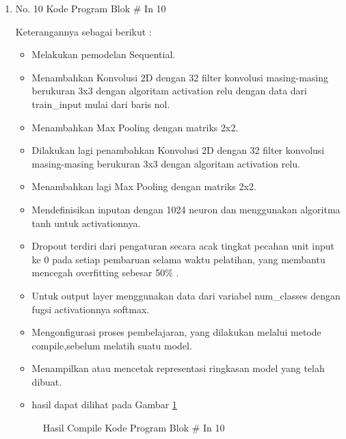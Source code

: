 \begin{enumerate}
\item No. 10 Kode Program Blok \# In 10
\par 
Keterangannya sebagai berikut :
\begin{itemize}
\item Melakukan pemodelan Sequential.
\item Menambahkan Konvolusi 2D dengan 32 filter konvolusi masing-masing berukuran 3x3 dengan algoritam activation relu dengan data dari train\_input mulai dari baris nol.
\item Menambahkan Max Pooling dengan matriks 2x2.
\item Dilakukan lagi penambahkan Konvolusi 2D dengan 32 filter konvolusi masing-masing berukuran 3x3 dengan algoritam activation relu.
\item Menambahkan lagi Max Pooling dengan matriks 2x2.
\item Mendefinisikan inputan dengan 1024 neuron dan menggunakan algoritma tanh untuk activationnya.
\item Dropout terdiri dari pengaturan secara acak tingkat pecahan unit input ke 0 pada setiap pembaruan selama waktu pelatihan, yang membantu mencegah overfitting sebesar 50\% .
\item Untuk output layer menggunakan data dari variabel num\_classes dengan fugsi activationnya softmax.
\item Mengonfigurasi proses pembelajaran, yang dilakukan melalui metode compile,sebelum melatih suatu model.
\item Menampilkan atau mencetak representasi ringkasan model yang telah dibuat.
\item hasil dapat dilihat pada Gambar \ref{refer21}
\end{itemize}

\begin{figure}[!htbp]
      \caption{Hasil Compile Kode Program Blok \# In 10}
      \label{refer21}
\end{figure}


\end{enumerate}
